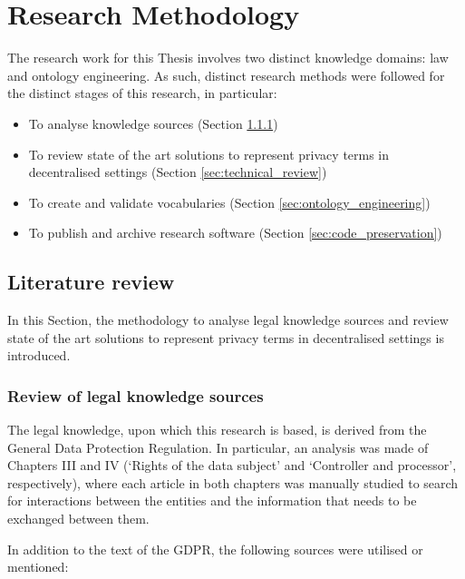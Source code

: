 \section{Research Methodology}
\label{sec:methodology}

The research work for this Thesis involves two distinct knowledge domains: law and ontology engineering. As such, distinct research methods were followed for the distinct stages of this research, in particular:

\begin{itemize}
    \item To analyse knowledge sources (Section \ref{sec:law_review})
    \item To review state of the art solutions to represent privacy terms in decentralised settings (Section \ref{sec:technical_review})
    \item To create and validate vocabularies (Section \ref{sec:ontology_engineering})
    \item To publish and archive research software (Section \ref{sec:code_preservation})
\end{itemize}

\subsection{Literature review}
\label{sec:literature_review}

In this Section, the methodology to analyse legal knowledge sources and review state of the art solutions to represent privacy terms in decentralised settings is introduced.

\subsubsection{Review of legal knowledge sources}
\label{sec:law_review}

The legal knowledge, upon which this research is based, is derived from the General Data Protection Regulation.
In particular, an analysis was made of Chapters III and IV (`Rights of the data subject' and `Controller and processor', respectively), where each article in both chapters was manually studied to search for interactions between the entities and the information that needs to be exchanged between them.

In addition to the text of the GDPR, the following sources were utilised or mentioned:

